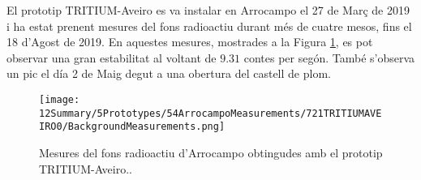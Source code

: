 El prototip TRITIUM-Aveiro es va instalar en Arrocampo el 27 de Març de 2019 i ha estat prenent mesures del fons radioactiu durant més de cuatre mesos, fins el 18 d'Agost de 2019. En aquestes mesures, mostrades a la Figura \ref{fig:FonsArrocampoAveiro}, es pot observar una gran estabilitat al voltant de $9.31$ contes per segón. També s'observa un pic el día 2 de Maig degut a una obertura del castell de plom.

\begin{figure}[h]
\centering
\texttt{[image: 12Summary/5Prototypes/54ArrocampoMeasurements/721TRITIUMAVEIRO0/BackgroundMeasurements.png]}
\caption{Mesures del fons radioactiu d'Arrocampo obtingudes amb el prototip TRITIUM-Aveiro.\cite{ExperimentalPaperCarlos}.\label{fig:FonsArrocampoAveiro}}
\end{figure}